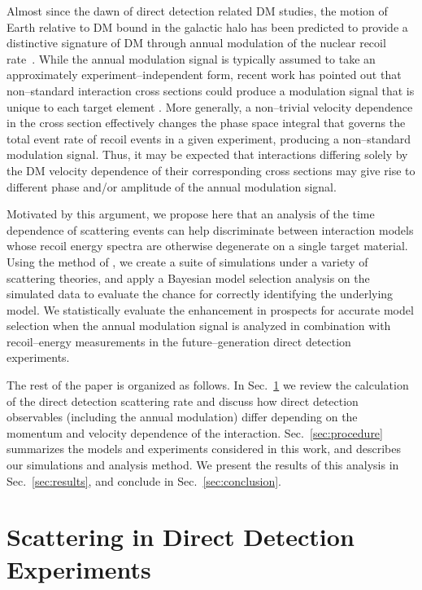 \documentclass[11pt, a4paper]{article}
\newcommand{\Sec}[1]{Sec.~\ref{#1}} \newcommand{\Secs}[2]{Secs.~\ref{#1} and \ref{#2}} \newcommand{\Secm}[2]{Secs.~\ref{#1} through \ref{#2}}
\begin{document}
Almost since the dawn of direct detection related DM studies, the motion of Earth relative to DM bound in the galactic halo has been predicted to provide a distinctive signature of DM through annual modulation of the nuclear recoil rate~\cite{Freese:1987wu, Freese:2012xd,Lee:2013xxa,Britto:2014wga,DelNobile:2015nua,Kouvaris:2015xga}. While the annual modulation signal is typically assumed to take an approximately experiment--independent form, recent work has pointed out that non--standard interaction cross sections could produce a modulation signal that is unique to each target element \cite{DelNobile:2015tza,DelNobile:2015rmp}. More generally, a non--trivial velocity dependence in the cross section effectively changes the phase space integral that governs the total event rate of recoil events in a given experiment, producing a non--standard modulation signal. Thus, it may be expected that interactions differing solely by the DM velocity dependence of their corresponding cross sections may give rise to different phase and/or amplitude of the annual modulation signal. 

Motivated by this argument, we propose here that an analysis of the time dependence of scattering events can help discriminate between interaction models whose recoil energy spectra are otherwise degenerate on a single target material. Using the method of \cite{Gluscevic:2015sqa}, we create a suite of simulations under a variety of scattering theories, and apply a Bayesian model selection analysis on the simulated data to evaluate the chance for correctly identifying the underlying model. We statistically evaluate the enhancement in prospects for accurate model selection when the annual modulation signal is analyzed in combination with recoil--energy measurements in the future--generation direct detection experiments. 

The rest of the paper is organized as follows. In \Sec{sec:dd} we review the calculation of the direct detection scattering rate and discuss how direct detection observables (including the annual modulation) differ depending on the momentum and velocity dependence of the interaction. \Sec{sec:procedure} summarizes the models and experiments considered in this work, and describes our simulations and analysis method. We present the results of this analysis in \Sec{sec:results}, and conclude in \Sec{sec:conclusion}.

\section{Scattering in Direct Detection Experiments}\label{sec:dd}
\end{document}
